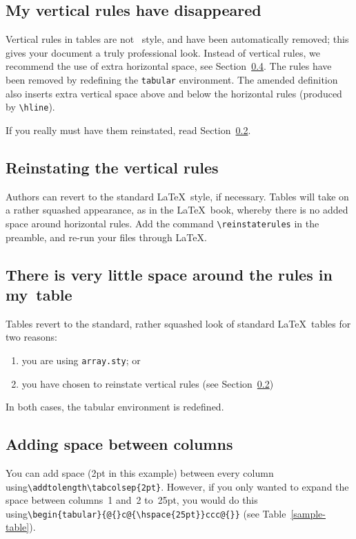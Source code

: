 \subsection{My vertical rules have disappeared}

Vertical rules in tables are not \cambridge\ style, and have been automatically removed; this gives your document a truly professional look. Instead of vertical rules, we recommend the use of extra horizontal space, see Section~\ref{addhoriz}. The rules have been removed by redefining the \verb"tabular" environment. The amended definition also inserts extra vertical space above and below the horizontal rules (produced by \verb"\hline").



If you really must have them reinstated, read Section~\ref{reinstate}.

\subsection{Reinstating the vertical rules}
\label{reinstate}
Authors can revert to the standard \LaTeX\ style, if necessary. Tables will take on a rather squashed appearance, as in the \LaTeX\ book, whereby there is no added space around horizontal rules. Add the command \verb"\reinstaterules" in the preamble, and re-run your files through \LaTeX.

\subsection{There is very little space around the rules in my~table}
Tables revert to the standard, rather squashed look of standard \LaTeX\ tables for two reasons:
\begin{enumerate}
  \item you are using \verb"array.sty"; or
  \item you have chosen to reinstate vertical rules (see Section~\ref{reinstate})
\end{enumerate}
In both cases, the tabular environment is redefined.


\subsection{Adding space between columns}
\label{addhoriz}
You can add space (2pt in this example) between every column using\linebreak \verb"\addtolength\tabcolsep{2pt}". However, if you only wanted to expand the space between columns~1 and~2 to~25pt, you would do this using\linebreak \verb"\begin{tabular}{@{}c@{\hspace{25pt}}ccc@{}}" (see Table~\ref{sample-table}).

